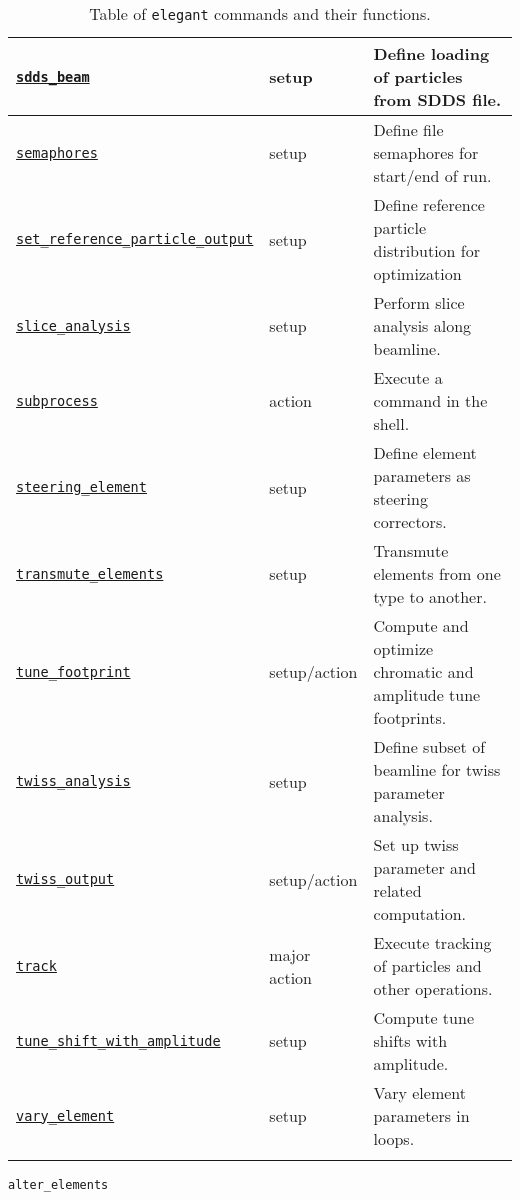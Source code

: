 \documentclass[11pt]{article}
\begin{document}
\begin{longtable}{|p{2.75in}|p{0.75in}|p{2.75in}|}
\hyperref[subsec:sddsbeam]{\tt sdds\_beam} & setup & Define loading of particles from SDDS file. \\ \hline
\hyperref[subsec:semaphores]{\tt semaphores} & setup & Define file semaphores for start/end of run. \\ \hline
\hyperref[subsec:setreferenceparticleoutput]{\tt set\_reference\_particle\_output} & setup  & Define reference particle distribution for optimization \\ \hline
\hyperref[subsec:sliceanalysis]{\tt slice\_analysis} & setup & Perform slice analysis along beamline. \\ \hline
\hyperref[subsec:subprocess]{\tt subprocess} & action & Execute a command in the shell. \\ \hline
\hyperref[subsec:steeringelement]{\tt steering\_element} & setup & Define element parameters as steering correctors. \\ \hline
\hyperref[subsec:transmuteelements]{\tt transmute\_elements} & setup & Transmute elements from one type to another. \\ \hline
\hyperref[subsec:tunefootprint]{\tt tune\_footprint} & setup/action & Compute and optimize chromatic and amplitude tune footprints. \\ \hline
\hyperref[subsec:twissanalysis]{\tt twiss\_analysis} & setup & Define subset of beamline for twiss parameter analysis. \\ \hline
\hyperref[subsec:twissoutput]{\tt twiss\_output} & setup/action & Set up twiss parameter and related computation. \\ \hline
\hyperref[subsec:track]{\tt track} & major action & Execute tracking of particles and other operations. \\ \hline
\hyperref[subsec:tuneshiftwithamplitude]{\tt tune\_shift\_with\_amplitude} & setup & Compute tune shifts with amplitude. \\ \hline
\hyperref[subsec:varyelement]{\tt vary\_element} & setup & Vary element parameters in loops. \\ \hline
\caption{Table of {\tt elegant} commands and their functions.}
\end{longtable}

\clearpage

\newpage
\begin{center}{\Large\verb|alter_elements|}\end{center}
\end{document}
